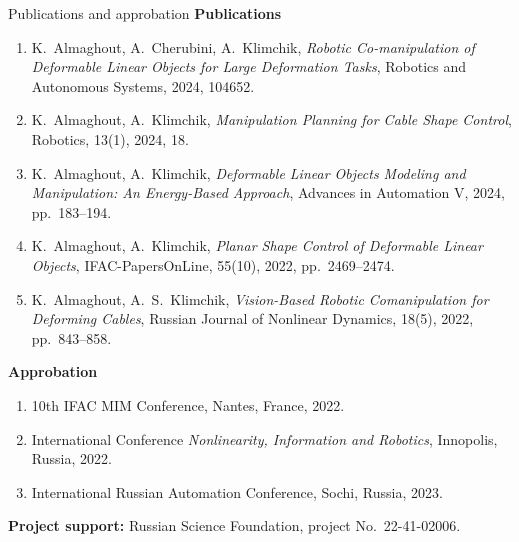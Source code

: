 \documentclass[aspectratio=169,10pt]{beamer}
\begin{document}
\begin{frame}[t]{Publications and approbation}
  \footnotesize
  \textbf{Publications}
  \begin{enumerate}
    \setlength{\itemsep}{0.03cm}
    \item K.~Almaghout, A.~Cherubini, A.~Klimchik,
      \emph{Robotic Co-manipulation of Deformable Linear Objects for Large
      Deformation Tasks}, Robotics and Autonomous Systems, 2024, 104652.
    \item K.~Almaghout, A.~Klimchik,
      \emph{Manipulation Planning for Cable Shape Control}, Robotics,
      13(1), 2024, 18.
    \item K.~Almaghout, A.~Klimchik,
      \emph{Deformable Linear Objects Modeling and Manipulation: An
      Energy-Based Approach}, Advances in Automation V, 2024, pp.~183--194.
    \item K.~Almaghout, A.~Klimchik,
      \emph{Planar Shape Control of Deformable Linear Objects},
      IFAC-PapersOnLine, 55(10), 2022, pp.~2469--2474.
    \item K.~Almaghout, A.~S.~Klimchik,
      \emph{Vision-Based Robotic Comanipulation for Deforming Cables},
      Russian Journal of Nonlinear Dynamics, 18(5), 2022, pp.~843--858.
  \end{enumerate}

  \vspace{0.06cm}
  \textbf{Approbation}
  \begin{enumerate}
    \setlength{\itemsep}{0.02cm}
    \item 10th IFAC MIM Conference, Nantes, France, 2022.
    \item International Conference \emph{Nonlinearity, Information and
      Robotics}, Innopolis, Russia, 2022.
    \item International Russian Automation Conference, Sochi, Russia, 2023.
  \end{enumerate}

  \vspace{0.04cm}
  \textbf{Project support:} Russian Science Foundation, project No.~22-41-02006.
\end{frame}
\end{document}
